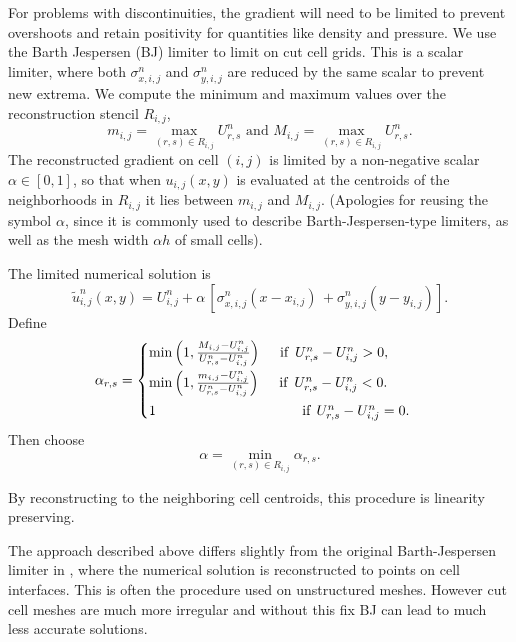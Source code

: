 For problems with discontinuities, the gradient will need to be limited
to prevent overshoots and retain positivity for quantities like density and
pressure.
We use the Barth Jespersen (BJ)  limiter \cite{barth-jespersen} to limit on 
cut cell grids. 
This is a scalar limiter, where both $\sigma^n_{x,i,j}$ and $\sigma^n_{y,i,j}$ 
are reduced by the same scalar to prevent new extrema.  
We compute the minimum and maximum values over the reconstruction 
stencil $R_{i,j}$, 
\begin{equation} 
m_{i,j} = \max_{(r,s) \in R_{i,j}} U^n_{r,s} \text{ and } 
M_{i,j} = \max_{(r,s) \in R_{i,j}} U^n_{r,s}.
\label{eqn:bj1}
\end{equation}
The reconstructed gradient on cell $(i,j)$ is limited by a non-negative 
scalar $\alpha \in [0,1]$, so that when ${u}_{i,j}(x,y)$ 
is evaluated at the centroids of the neighborhoods in $R_{i,j}$ it
lies between $m_{i,j}$ and $M_{i,j}$.
(Apologies for reusing the symbol $\alpha$, since it is commonly 
used to describe Barth-Jespersen-type limiters, as well as the 
mesh width $\alpha h$  of small cells).

The limited numerical solution is
\begin{equation}
     \tilde{u}^n_{i,j}(x,y) = U_{i,j}^n + \alpha \, [{\sigma}^n_{x,i,j} ( x -  x_{i,j}) \, 
   + {\sigma}^n_{y,i,j}( y -  y_{i,j})].
\end{equation}
Define
\begin{equation}\label{eq:bj_alpha}
    \alpha_{r,s} = \begin{cases}
           \min \left(1,\frac{M_{i,j}-U_{i,j}^n}{U^n_{r,s} - U_{i,j}^n} \right)
    \quad  \text{ if } \,   U_{r,s}^n - U_{i,j}^n >  0,\\[.08in]
            \min \left(1, \frac{m_{i,j}-U_{i,j}^n}{U^n_{r,s} - U_{i,j}^n} \right)  
    \quad  \text{ if }  \, U^n_{r,s} - U_{i,j}^n < 0.\\[.08in]
             1    \hspace*{1.45in}  \text{if} \; \, U^n_{r,s} - U_{i,j}^n = 0.
    \end{cases}
\end{equation}
Then choose
\begin{equation}\label{eqn:alpha}
\alpha = \min_{(r,s) \in R_{i,j}} \alpha_{r,s} .
\end{equation}

By reconstructing to the neighboring cell centroids, this procedure is linearity preserving.  

The approach described above differs slightly from the original Barth-Jespersen limiter in
\cite{barth-jespersen}, where the numerical solution is reconstructed to 
points on cell interfaces.
This is often the procedure used on unstructured meshes. However cut cell meshes are much more
irregular and without this fix BJ can lead to much less accurate solutions.

